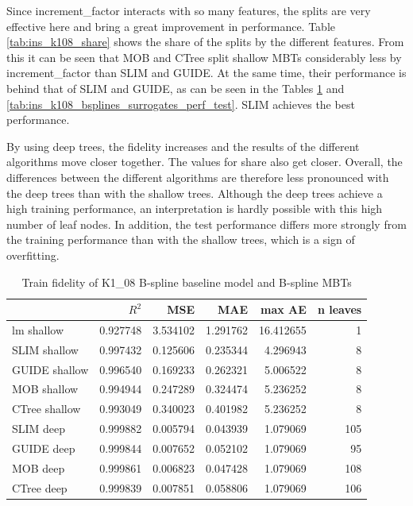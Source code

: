 Since increment\_factor interacts with so many features, the splits are very effective here and bring a great improvement in performance. Table \ref{tab:ins_k108_share} shows the share of the splits by the different features. From this it can be seen that MOB and CTree split shallow MBTs considerably less by increment\_factor than SLIM and GUIDE. At the same time, their performance is behind that of SLIM and GUIDE, as can be seen in the Tables \ref{tab:ins_k108_bsplines_surrogates_perf_train} and \ref{tab:ins_k108_bsplines_surrogates_perf_test}. SLIM achieves the best performance.




\clearpage

By using deep trees, the fidelity increases and the results of the different algorithms move closer together. The values for share also get closer. Overall, the differences between the different algorithms are therefore less pronounced with the deep trees than with the shallow trees. Although the deep trees achieve a high training performance, an interpretation is hardly possible with this high number of leaf nodes. In addition, the test performance differs more strongly from the training performance than with the shallow trees, which is a sign of overfitting.



\begin{table}[!htb]

\caption{Train fidelity of K1\_08 B-spline baseline model and  B-spline MBTs}
\centering \small
\begin{tabular}[t]{l|r|r|r|r|r}
\hline
  & $R^2$ & MSE & MAE & max AE & n leaves\\
\hline
lm shallow & 0.927748 & 3.534102 & 1.291762 & 16.412655 & 1\\
\hline
SLIM shallow & 0.997432 & 0.125606 & 0.235344 & 4.296943 & 8\\
GUIDE shallow & 0.996540 & 0.169233 & 0.262321 & 5.006522 & 8\\
MOB shallow & 0.994944 & 0.247289 & 0.324474 & 5.236252 & 8\\
CTree shallow & 0.993049 & 0.340023 & 0.401982 & 5.236252 & 8\\
\hline
SLIM deep & 0.999882 & 0.005794 & 0.043939 & 1.079069 & 105\\
GUIDE deep & 0.999844 & 0.007652 & 0.052102 & 1.079069 & 95\\
MOB deep & 0.999861 & 0.006823 & 0.047428 & 1.079069 & 108\\
CTree deep & 0.999839 & 0.007851 & 0.058806 & 1.079069 & 106\\
\hline
\end{tabular}
\label{tab:ins_k108_bsplines_surrogates_perf_train}
\end{table}




